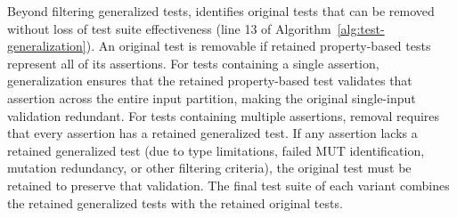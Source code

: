Beyond filtering generalized tests, \ToolTeralizer{} identifies original tests
that can be removed without loss of test suite effectiveness
(line 13 of Algorithm~\ref{alg:test-generalization}).
An original test is removable if retained property-based tests represent all of its assertions.
For tests containing a single assertion, generalization ensures that
the retained property-based test validates that assertion across the entire input partition,
making the original single-input validation redundant.
For tests containing multiple assertions, removal requires that
every assertion has a retained generalized test.
If any assertion lacks a retained generalized test
(due to type limitations, failed MUT identification, mutation redundancy, or other filtering criteria),
the original test must be retained to preserve that validation.
The final test suite of each variant
combines the retained generalized tests
with the retained original tests.

